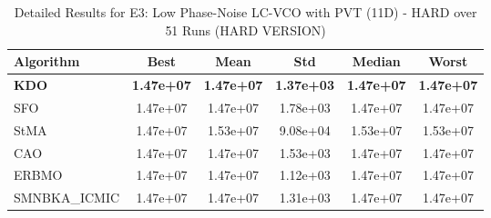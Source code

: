 \begin{table}[htbp]
\centering
\caption{Detailed Results for E3: Low Phase-Noise LC-VCO with PVT (11D) - HARD over 51 Runs (HARD VERSION)}
\label{tab:P3_detailed}
\small
\begin{tabular}{lccccc}
\toprule
\textbf{Algorithm} & \textbf{Best} & \textbf{Mean} & \textbf{Std} & \textbf{Median} & \textbf{Worst} \\
\midrule
\textbf{KDO} & \textbf{1.47e+07} & \textbf{1.47e+07} & \textbf{1.37e+03} & \textbf{1.47e+07} & \textbf{1.47e+07} \\
SFO & 1.47e+07 & 1.47e+07 & 1.78e+03 & 1.47e+07 & 1.47e+07 \\
StMA & 1.47e+07 & 1.53e+07 & 9.08e+04 & 1.53e+07 & 1.53e+07 \\
CAO & 1.47e+07 & 1.47e+07 & 1.53e+03 & 1.47e+07 & 1.47e+07 \\
ERBMO & 1.47e+07 & 1.47e+07 & 1.12e+03 & 1.47e+07 & 1.47e+07 \\
SMNBKA_ICMIC & 1.47e+07 & 1.47e+07 & 1.31e+03 & 1.47e+07 & 1.47e+07 \\
\bottomrule
\end{tabular}
\end{table}
